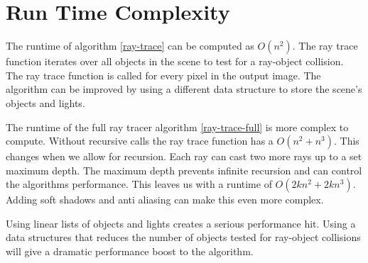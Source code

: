 \section{Run Time Complexity}
The runtime of algorithm \ref{ray-trace} can be computed as $O(n^2)$.    The ray trace function iterates over all objects in the scene to test for a ray-object collision.  The ray trace function is called for every pixel in the output image.   The algorithm can be improved by using a different data structure to store the scene's objects and lights.

The runtime of the full ray tracer algorithm \ref{ray-trace-full} is more complex to compute.  Without recursive calls the ray trace function has a $O(n^2 + n^3 )$.  This changes when we allow for recursion.  Each ray can cast two more rays up to a set maximum depth.  The maximum depth prevents infinite recursion and can control the algorithms performance.  This leaves us with a runtime of $O(2kn^2+2kn^3)$.  Adding soft shadows and anti aliasing can make this even more complex.

Using linear lists of objects and lights creates a serious performance hit.  Using a data structures that reduces the number of objects tested for ray-object collisions will give a dramatic performance boost to the algorithm.

